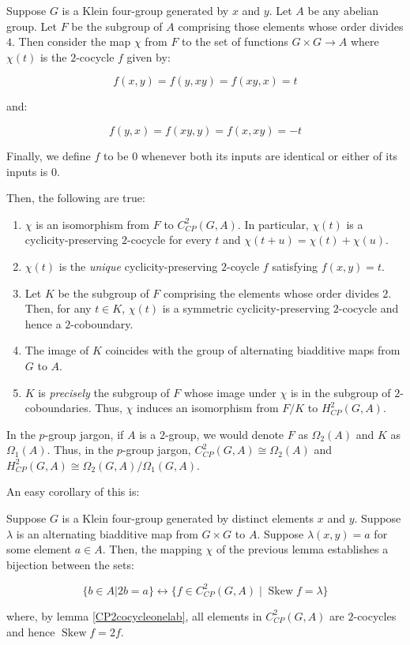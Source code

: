 \documentclass[10pt]{amsart}
\newcommand{\Skew}{\operatorname{Skew}}
\begin{document}
\begin{lemma}\label{KleinfourCPcocycleclassification}
  Suppose $G$ is a Klein four-group generated by $x$ and $y$. Let $A$
  be any abelian group. Let $F$ be the subgroup of $A$ comprising
  those elements whose order divides $4$. Then consider the map $\chi$
  from $F$ to the set of functions $G \times G \to A$ where $\chi(t)$
  is the $2$-cocycle $f$ given by:

  $$f(x,y) = f(y,xy) = f(xy,x) = t$$

  and:

  $$f(y,x) = f(xy,y) = f(x,xy) = -t$$

  Finally, we define $f$ to be $0$ whenever both its inputs are
  identical or either of its inputs is $0$.

  Then, the following are true:

  \begin{enumerate}
  \item $\chi$ is an isomorphism from $F$ to $C^2_{CP}(G,A)$. In
    particular, $\chi(t)$ is a cyclicity-preserving $2$-cocycle for
    every $t$ and $\chi(t + u) = \chi(t) + \chi(u)$.
  \item $\chi(t)$ is the {\em unique} cyclicity-preserving $2$-coycle
    $f$ satisfying $f(x,y) = t$.
  \item Let $K$ be the subgroup of $F$ comprising the elements whose
    order divides $2$. Then, for any $t \in K$, $\chi(t)$ is a
    symmetric cyclicity-preserving $2$-cocycle and hence a
    $2$-coboundary.
  \item The image of $K$ coincides with the group of alternating
    biadditive maps from $G$ to $A$.
  \item $K$ is {\em precisely} the subgroup of $F$ whose image under
    $\chi$ is in the subgroup of $2$-coboundaries. Thus, $\chi$
    induces an isomorphism from $F/K$ to $H^2_{CP}(G,A)$.
  \end{enumerate}

  In the $p$-group jargon, if $A$ is a $2$-group, we would denote $F$
  as $\Omega_2(A)$ and $K$ as $\Omega_1(A)$. Thus, in the $p$-group
  jargon, $C^2_{CP}(G,A) \cong \Omega_2(A)$ and $H^2_{CP}(G,A) \cong
  \Omega_2(G,A)/\Omega_1(G,A)$.
\end{lemma}

An easy corollary of this is:

\begin{lemma}
  Suppose $G$ is a Klein four-group generated by distinct elements $x$
  and $y$. Suppose $\lambda$ is an alternating biadditive map from $G
  \times G$ to $A$. Suppose $\lambda(x,y) = a$ for some element $a \in
  A$. Then, the mapping $\chi$ of the previous lemma establishes a
  bijection between the sets:

  $$\{ b \in A | 2b = a \} \leftrightarrow \{ f \in C^2_{CP}(G,A) \mid \Skew f = \lambda \}$$

  where, by lemma \ref{CP2cocycleonelab}, all elements in
  $C^2_{CP}(G,A)$ are $2$-cocycles and hence $\Skew f = 2f$.
\end{lemma}
\end{document}
